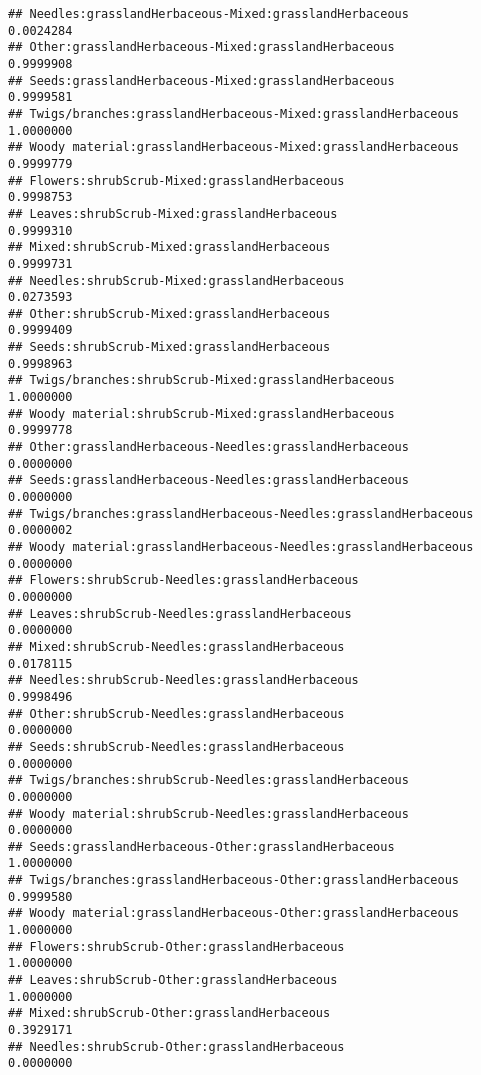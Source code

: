 \documentclass[
]{article}
\begin{document}
\begin{verbatim}
## Needles:grasslandHerbaceous-Mixed:grasslandHerbaceous                 0.0024284
## Other:grasslandHerbaceous-Mixed:grasslandHerbaceous                   0.9999908
## Seeds:grasslandHerbaceous-Mixed:grasslandHerbaceous                   0.9999581
## Twigs/branches:grasslandHerbaceous-Mixed:grasslandHerbaceous          1.0000000
## Woody material:grasslandHerbaceous-Mixed:grasslandHerbaceous          0.9999779
## Flowers:shrubScrub-Mixed:grasslandHerbaceous                          0.9998753
## Leaves:shrubScrub-Mixed:grasslandHerbaceous                           0.9999310
## Mixed:shrubScrub-Mixed:grasslandHerbaceous                            0.9999731
## Needles:shrubScrub-Mixed:grasslandHerbaceous                          0.0273593
## Other:shrubScrub-Mixed:grasslandHerbaceous                            0.9999409
## Seeds:shrubScrub-Mixed:grasslandHerbaceous                            0.9998963
## Twigs/branches:shrubScrub-Mixed:grasslandHerbaceous                   1.0000000
## Woody material:shrubScrub-Mixed:grasslandHerbaceous                   0.9999778
## Other:grasslandHerbaceous-Needles:grasslandHerbaceous                 0.0000000
## Seeds:grasslandHerbaceous-Needles:grasslandHerbaceous                 0.0000000
## Twigs/branches:grasslandHerbaceous-Needles:grasslandHerbaceous        0.0000002
## Woody material:grasslandHerbaceous-Needles:grasslandHerbaceous        0.0000000
## Flowers:shrubScrub-Needles:grasslandHerbaceous                        0.0000000
## Leaves:shrubScrub-Needles:grasslandHerbaceous                         0.0000000
## Mixed:shrubScrub-Needles:grasslandHerbaceous                          0.0178115
## Needles:shrubScrub-Needles:grasslandHerbaceous                        0.9998496
## Other:shrubScrub-Needles:grasslandHerbaceous                          0.0000000
## Seeds:shrubScrub-Needles:grasslandHerbaceous                          0.0000000
## Twigs/branches:shrubScrub-Needles:grasslandHerbaceous                 0.0000000
## Woody material:shrubScrub-Needles:grasslandHerbaceous                 0.0000000
## Seeds:grasslandHerbaceous-Other:grasslandHerbaceous                   1.0000000
## Twigs/branches:grasslandHerbaceous-Other:grasslandHerbaceous          0.9999580
## Woody material:grasslandHerbaceous-Other:grasslandHerbaceous          1.0000000
## Flowers:shrubScrub-Other:grasslandHerbaceous                          1.0000000
## Leaves:shrubScrub-Other:grasslandHerbaceous                           1.0000000
## Mixed:shrubScrub-Other:grasslandHerbaceous                            0.3929171
## Needles:shrubScrub-Other:grasslandHerbaceous                          0.0000000

\end{verbatim}
\end{document}
